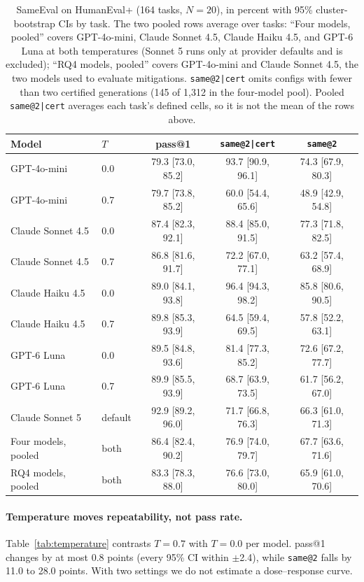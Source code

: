 \documentclass[acmsmall,screen,review,anonymous]{acmart}
\makeatletter
\newcommand{\sameeval}{SameEval}
\newcommand{\sameat}{\mbox{\texttt{same@2}}}
\newcommand{\sameatc}{\mbox{\texttt{same@2|cert}}}
\makeatother
\begin{document}
\begin{table}[t]
  \small
  \setlength{\tabcolsep}{4pt}
  \caption{\sameeval{} on HumanEval+ (164 tasks, $N{=}20$), in percent with
  95\% cluster-bootstrap CIs by task.
  The two pooled rows average over tasks: ``Four models, pooled'' covers
  GPT-4o-mini, Claude Sonnet 4.5, Claude Haiku 4.5, and GPT-6 Luna at both
  temperatures (Sonnet 5 runs only at provider defaults and is excluded);
  ``RQ4 models, pooled'' covers GPT-4o-mini and Claude Sonnet 4.5, the two
  models used to evaluate mitigations.
  \sameatc{} omits configs with fewer than two certified generations
  (145 of 1{,}312 in the four-model pool).
  Pooled \sameatc{} averages each task's defined cells, so it is not the
  mean of the rows above.}
  \label{tab:he-table1}
  \begin{tabular}{llccc}
    \toprule
    Model & $T$ & pass@1 & \sameatc{} & \sameat{} \\
    \midrule
    GPT-4o-mini & 0.0 & 79.3 [73.0, 85.2] & 93.7 [90.9, 96.1] & 74.3 [67.9, 80.3] \\
    GPT-4o-mini & 0.7 & 79.7 [73.8, 85.2] & 60.0 [54.4, 65.6] & 48.9 [42.9, 54.8] \\
    Claude Sonnet 4.5 & 0.0 & 87.4 [82.3, 92.1] & 88.4 [85.0, 91.5] & 77.3 [71.8, 82.5] \\
    Claude Sonnet 4.5 & 0.7 & 86.8 [81.6, 91.7] & 72.2 [67.0, 77.1] & 63.2 [57.4, 68.9] \\
    Claude Haiku 4.5 & 0.0 & 89.0 [84.1, 93.8] & 96.4 [94.3, 98.2] & 85.8 [80.6, 90.5] \\
    Claude Haiku 4.5 & 0.7 & 89.8 [85.3, 93.9] & 64.5 [59.4, 69.5] & 57.8 [52.2, 63.1] \\
    GPT-6 Luna & 0.0 & 89.5 [84.8, 93.6] & 81.4 [77.3, 85.2] & 72.6 [67.2, 77.7] \\
    GPT-6 Luna & 0.7 & 89.9 [85.5, 93.9] & 68.7 [63.9, 73.5] & 61.7 [56.2, 67.0] \\
    Claude Sonnet 5 & default & 92.9 [89.2, 96.0] & 71.7 [66.8, 76.3] & 66.3 [61.0, 71.3] \\
    \midrule
    Four models, pooled & both & 86.4 [82.4, 90.2] & 76.9 [74.0, 79.7] & 67.7 [63.6, 71.6] \\
    RQ4 models, pooled & both & 83.3 [78.3, 88.0] & 76.6 [73.0, 80.0] & 65.9 [61.0, 70.6] \\
    \bottomrule
  \end{tabular}
\end{table}

\paragraph{Temperature moves repeatability, not pass rate.}
Table~\ref{tab:temperature} contrasts $T{=}0.7$ with $T{=}0.0$ per model.
pass@1 changes by at most 0.8 points (every 95\% CI within $\pm$2.4),
while \sameat{} falls by 11.0 to 28.0 points.
With two settings we do not estimate a dose--response curve.
\end{document}
